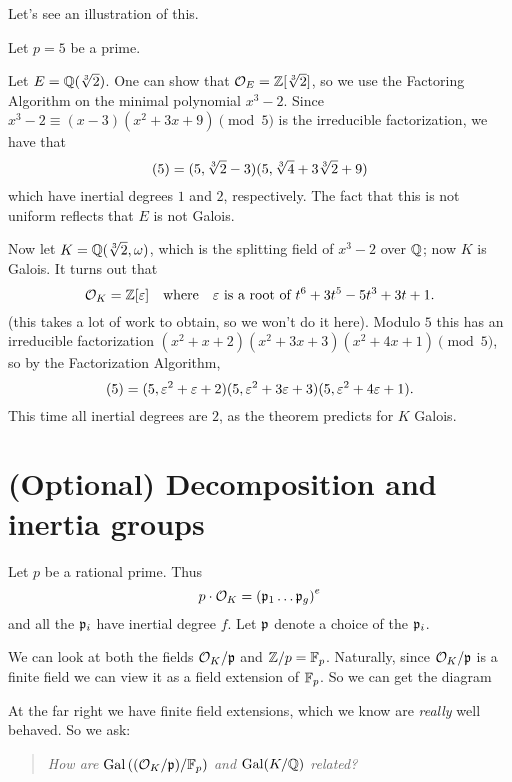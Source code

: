 Let's see an illustration of this.
\begin{example}
	Let $p = 5$ be a prime.
	\begin{enumerate}[(a)]
		\ii Let $E = \mathbb Q(\sqrt[3]{2})$.
		One can show that $\mathcal O_E = \mathbb Z[\sqrt[3]{2}]$, so
		we use the Factoring Algorithm on the minimal polynomial $x^3-2$.
		Since $x^3-2 \equiv (x-3)(x^2+3x+9) \pmod 5$ is the irreducible factorization,
		we have that
		\[ (5) = (5,\sqrt[3]{2}-3)(5, \sqrt[3]{4}+3\sqrt[3]{2}+9) \]
		which have inertial degrees $1$ and $2$, respectively.
		The fact that this is not uniform reflects that $E$ is not Galois.

		\ii Now let $K = \mathbb Q(\sqrt[3]{2},\omega)$, which is the splitting
		field of $x^3-2$ over $\mathbb Q$; now $K$ is Galois.
		It turns out that
		\[ \mathcal O_K = \mathbb Z[\varepsilon] \quad\text{where}\quad \varepsilon \text { is a root of } t^6+3t^5-5t^3+3t+1. \]
		(this takes a lot of work to obtain, so we won't do it here).
		Modulo $5$ this has an irreducible factorization
		$(x^2+x+2)(x^2+3x+3)(x^2+4x+1) \pmod 5$,
		so by the Factorization Algorithm,
		\[ (5) = (5, \varepsilon^2+\varepsilon+2)(5, \varepsilon^2+3\varepsilon+3)(5, \varepsilon^2+4\varepsilon+1). \]
		This time all inertial degrees are $2$, as the theorem predicts for $K$ Galois.
	\end{enumerate}
\end{example}

\section{(Optional) Decomposition and inertia groups}
Let $p$ be a rational prime.
Thus
\[ p \cdot \mathcal O_K = \left( \mathfrak p_1 \dots \mathfrak p_g \right)^e \]
and all the $\mathfrak p_i$ have inertial degree $f$.
Let $\mathfrak p$ denote a choice of the $\mathfrak p_i$.

We can look at both the fields $\mathcal O_K / \mathfrak p$ and $\mathbb Z / p = \mathbb F_p$.
Naturally, since $\mathcal O_K / \mathfrak p$ is a finite field we can view it as a field extension of $\mathbb F_p$.
So we can get the diagram
\begin{center}
\end{center}
At the far right we have finite field extensions, which we know are \emph{really} well behaved.
So we ask:
\begin{quote}
	\itshape
	How are $\operatorname{Gal}\left( (\mathcal O_K/\mathfrak p) / \mathbb F_p \right)$
	and $\operatorname{Gal}(K/\mathbb Q)$ related?
\end{quote}

